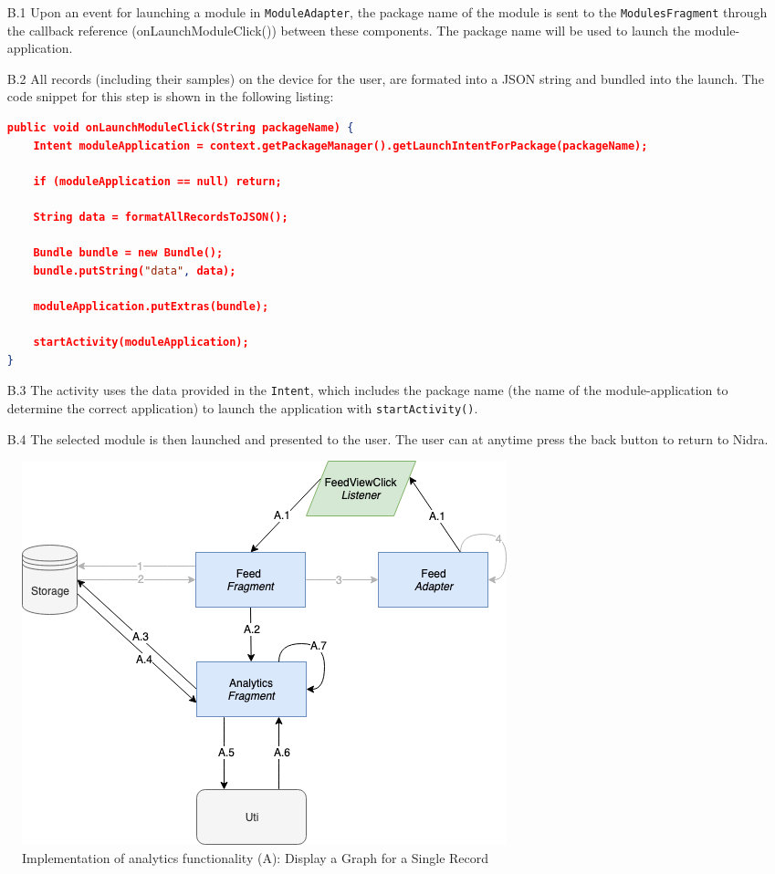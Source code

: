 \begin{itemize}
    \item[B.1] Upon an event for launching a module in \verb|ModuleAdapter|, the package name of the module is sent to the \verb|ModulesFragment| through the callback reference (onLaunchModuleClick()) between these components. The package name will be used to launch the module-application.
    \item[B.2] All records (including their samples) on the device for the user, are formated into a JSON string and bundled into the launch. The code snippet for this step is shown in the following listing:
\begin{lstlisting}[language=json, caption={}, captionpos=b]
public void onLaunchModuleClick(String packageName) {
    Intent moduleApplication = context.getPackageManager().getLaunchIntentForPackage(packageName);

    if (moduleApplication == null) return;

    String data = formatAllRecordsToJSON();

    Bundle bundle = new Bundle();
    bundle.putString("data", data);

    moduleApplication.putExtras(bundle);

    startActivity(moduleApplication);
}
\end{lstlisting}

    \item[B.3] The activity uses the data provided in the \verb|Intent|, which includes the package name (the name of the module-application to determine the correct application) to launch the application with \verb|startActivity()|.
    \item[B.4] The selected module is then launched and presented to the user. The user can at anytime press the back button to return to Nidra.  
\end{itemize}

\begin{figure}
    \centering
    \includegraphics[scale=0.5]{images/Anal_Imp.png}
    \caption{Implementation of analytics functionality (A): Display a Graph for a Single Record}
    \label{fig:impl_analytics}
\end{figure}

